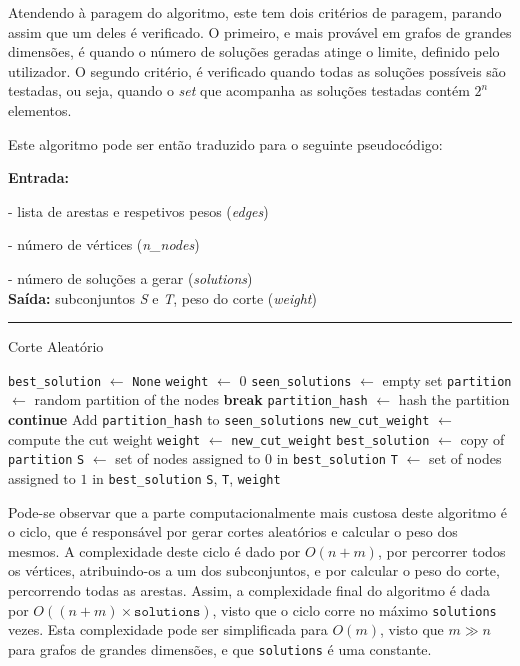 \documentclass[mirror, portugues]{revdetua}
\begin{document}
Atendendo à paragem do algoritmo, este tem dois critérios de paragem, parando assim que um deles é verificado. O primeiro, e mais provável em grafos de grandes dimensões, é quando o número de soluções geradas atinge o limite, definido pelo utilizador. O segundo critério, é verificado quando todas as soluções possíveis são testadas, ou seja, quando o \textit{set} que acompanha as soluções testadas contém $2^n$ elementos.

Este algoritmo pode ser então traduzido para o seguinte pseudocódigo:

\begin{algorithm}[H]
\raggedright
\textbf{Entrada:}

- lista de arestas e respetivos pesos (\textit{edges})

- número de vértices (\textit{n\_nodes})

- número de soluções a gerar (\textit{solutions})\\
\textbf{Saída:} subconjuntos \textit{S} e \textit{T}, peso do corte (\textit{weight}) \\
\hrule 
\caption{Corte Aleatório}
\begin{algorithmic}[1]
    \State \texttt{best\_solution} $\gets$ \texttt{None}
    \State \texttt{weight} $\gets$ 0
    \State \texttt{seen\_solutions} $\gets$ empty set
        \State \texttt{partition} $\gets$ random partition of the nodes
            \State \textbf{break}
        \EndIf
        \State \texttt{partition\_hash} $\gets$ hash the partition
            \State \textbf{continue}
        \EndIf
        \State Add \texttt{partition\_hash} to \texttt{seen\_solutions}
        \State \texttt{new\_cut\_weight} $\gets$ compute the cut weight
            \State \texttt{weight} $\gets$ \texttt{new\_cut\_weight}
            \State \texttt{best\_solution} $\gets$ copy of \texttt{partition}
        \EndIf
    \EndFor
    \State \texttt{S} $\gets$ set of nodes assigned to $0$ in \texttt{best\_solution}
    \State \texttt{T} $\gets$ set of nodes assigned to $1$ in \texttt{best\_solution}
    \Return \texttt{S}, \texttt{T}, \texttt{weight}
\end{algorithmic}
\end{algorithm}
    
Pode-se observar que a parte computacionalmente mais custosa deste algoritmo é o ciclo, que é responsável por gerar cortes aleatórios e calcular o peso dos mesmos. A complexidade deste ciclo é dado por $O(n + m)$, por percorrer todos os vértices, atribuindo-os a um dos subconjuntos, e por calcular o peso do corte, percorrendo todas as arestas. Assim, a complexidade final do algoritmo é dada por $O((n + m) \times \texttt{solutions})$, visto que o ciclo corre no máximo \texttt{solutions} vezes. Esta complexidade pode ser simplificada para $O(m)$, visto que $m \gg n$ para grafos de grandes dimensões, e que \texttt{solutions} é uma constante.
\end{document}
